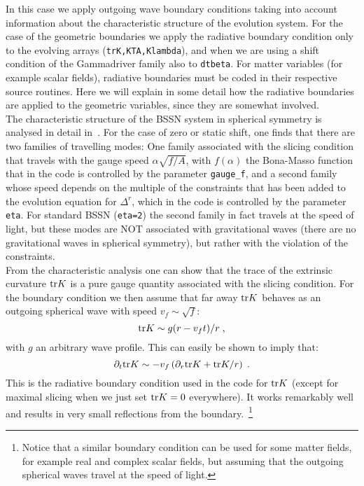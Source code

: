\documentclass[12pt]{article}
\begin{document}
In this case we apply outgoing wave boundary conditions taking into
account information about the characteristic structure of the
evolution system.  For the case of the geometric boundaries we apply
the radiative boundary condition only to the evolving arrays
(\texttt{trK,KTA,Klambda}), and when we are using a shift condition of
the Gammadriver family also to \texttt{dtbeta}.  For matter variables
(for example scalar fields), radiative boundaries must be coded in
their respective source routines. Here we will explain in some detail
how the radiative boundaries are applied to the geometric variables,
since they are somewhat involved. \\

The characteristic structure of the BSSN system in spherical symmetry
is analysed in detail in~\cite{Alcubierre15}. For the case of zero or
static shift, one finds that there are two families of travelling
modes: One family associated with the slicing condition that travels
with the gauge speed $\alpha \sqrt{f/A}$, with $f(\alpha)$ the
Bona-Masso function that in the code is controlled by the parameter
\texttt{gauge\_f}, and a second family whose speed depends on the
multiple of the constraints that has been added to the evolution
equation for $\Delta^r$, which in the code is controlled by the
parameter \texttt{eta}.  For standard BSSN (\texttt{eta=2}) the second
family in fact travels at the speed of light, but these modes are NOT
associated with gravitational waves (there are no gravitational waves
in spherical symmetry), but rather with the violation of the
constraints. \\

From the characteristic analysis one can show that the trace of the
extrinsic curvature ${\rm tr} K$ is a pure gauge quantity associated
with the slicing condition.  For the boundary condition we then assume
that far away ${\rm tr} K$ behaves as an outgoing spherical wave with
speed $v_f \sim \sqrt{f}$:
\begin{equation}
{\rm tr} K \sim g(r - v_f t)/r \; ,
\end{equation}
with $g$ an arbitrary wave profile.  This can easily be shown to imply
that:
\begin{equation}
\partial_t {\rm tr} K \sim - v_f \left( \partial_r {\rm tr} K
+ {\rm tr} K / r \right) \; .
\end{equation}
This is the radiative boundary condition used in the code for ${\rm
  tr} K$ (except for maximal slicing when we just set ${\rm tr} K=0$
everywhere).  It works remarkably well and results in very small
reflections from the boundary.~\footnote{Notice that a similar
  boundary condition can be used for some matter fields, for example
  real and complex scalar fields, but assuming that the outgoing
  spherical waves travel at the speed of light.} \\
\end{document}
